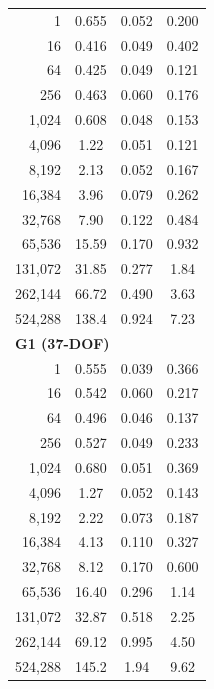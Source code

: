 \begin{table}[t]
\begin{tabular}{rccc}
1 & 0.655 & 0.052 & 0.200 \\
16 & 0.416 & 0.049 & 0.402 \\
64 & 0.425 & 0.049 & 0.121 \\
256 & 0.463 & 0.060 & 0.176 \\
1,024 & 0.608 & 0.048 & 0.153 \\
4,096 & 1.22 & 0.051 & 0.121 \\
8,192 & 2.13 & 0.052 & 0.167 \\
16,384 & 3.96 & 0.079 & 0.262 \\
32,768 & 7.90 & 0.122 & 0.484 \\
65,536 & 15.59 & 0.170 & 0.932 \\
131,072 & 31.85 & 0.277 & 1.84 \\
262,144 & 66.72 & 0.490 & 3.63 \\
524,288 & 138.4 & 0.924 & 7.23 \\
\midrule
\multicolumn{4}{l}{\textbf{G1 (37-DOF)}} \\
1 & 0.555 & 0.039 & 0.366 \\
16 & 0.542 & 0.060 & 0.217 \\
64 & 0.496 & 0.046 & 0.137 \\
256 & 0.527 & 0.049 & 0.233 \\
1,024 & 0.680 & 0.051 & 0.369 \\
4,096 & 1.27 & 0.052 & 0.143 \\
8,192 & 2.22 & 0.073 & 0.187 \\
16,384 & 4.13 & 0.110 & 0.327 \\
32,768 & 8.12 & 0.170 & 0.600 \\
65,536 & 16.40 & 0.296 & 1.14 \\
131,072 & 32.87 & 0.518 & 2.25 \\
262,144 & 69.12 & 0.995 & 4.50 \\
524,288 & 145.2 & 1.94 & 9.62 \\
\bottomrule
\end{tabular}
\end{table}